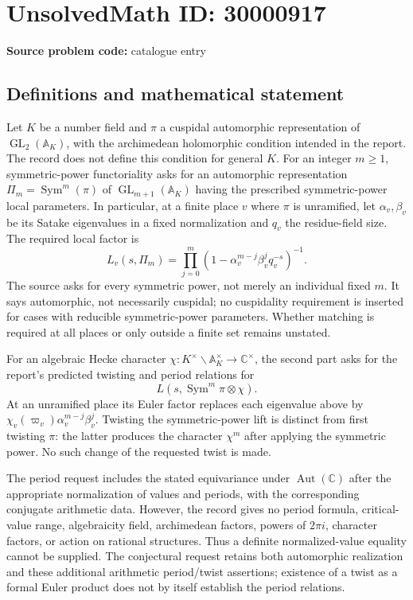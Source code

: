 \documentclass[11pt]{article}
\newcommand{\C}{\mathbb{C}}
\begin{document}
\section*{UnsolvedMath ID: 30000917}
\textbf{Source problem code:} catalogue entry
\subsection{Definitions and mathematical statement}
Let \(K\) be a number field and \(\pi\) a cuspidal automorphic representation of \(\operatorname{GL}_2(\mathbb A_K)\), with the archimedean holomorphic condition intended in the report. The record does not define this condition for general \(K\). For an integer \(m\geq1\), symmetric-power functoriality asks for an automorphic representation \(\Pi_m=\operatorname{Sym}^m(\pi)\) of \(\operatorname{GL}_{m+1}(\mathbb A_K)\) having the prescribed symmetric-power local parameters. In particular, at a finite place \(v\) where \(\pi\) is unramified, let \(\alpha_v,\beta_v\) be its Satake eigenvalues in a fixed normalization and \(q_v\) the residue-field size. The required local factor is
\[
 L_v(s,\Pi_m)=\prod_{j=0}^m
   (1-\alpha_v^{m-j}\beta_v^j q_v^{-s})^{-1}.
\]
The source asks for every symmetric power, not merely an individual fixed \(m\). It says automorphic, not necessarily cuspidal; no cuspidality requirement is inserted for cases with reducible symmetric-power parameters. Whether matching is required at all places or only outside a finite set remains unstated.

For an algebraic Hecke character \(\chi:K^\times\backslash\mathbb A_K^\times\to\C^\times\), the second part asks for the report's predicted twisting and period relations for
\[
 L(s,\operatorname{Sym}^m\pi\otimes\chi).
\]
At an unramified place its Euler factor replaces each eigenvalue above by \(\chi_v(\varpi_v)\alpha_v^{m-j}\beta_v^j\). Twisting the symmetric-power lift is distinct from first twisting \(\pi\): the latter produces the character \(\chi^m\) after applying the symmetric power. No such change of the requested twist is made.

The period request includes the stated equivariance under \(\operatorname{Aut}(\C)\) after the appropriate normalization of values and periods, with the corresponding conjugate arithmetic data. However, the record gives no period formula, critical-value range, algebraicity field, archimedean factors, powers of \(2\pi i\), character factors, or action on rational structures. Thus a definite normalized-value equality cannot be supplied. The conjectural request retains both automorphic realization and these additional arithmetic period/twist assertions; existence of a twist as a formal Euler product does not by itself establish the period relations.
\end{document}

